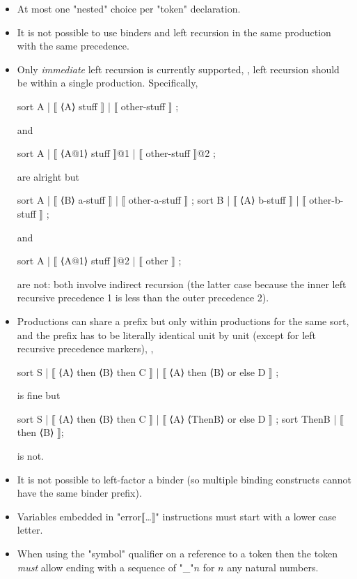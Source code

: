 \documentclass[11pt]{article} %
\begin{document}
\begin{itemize}

\item At most one "nested" choice per "token" declaration.

\item It is not possible to use binders and left recursion in the same production with the same
  precedence.

\item Only \emph{immediate} left recursion is currently supported, \ie, left recursion should be
  within a single production. Specifically,
\begin{hacs}
sort A | ⟦ ⟨A⟩ stuff ⟧ | ⟦ other-stuff ⟧ ;
\end{hacs}
  and 
\begin{hacs}
sort A | ⟦ ⟨A@1⟩ stuff ⟧@1 | ⟦ other-stuff ⟧@2 ;
\end{hacs}
  are alright but
\begin{hacs}
sort A | ⟦ ⟨B⟩ a-stuff ⟧ | ⟦ other-a-stuff ⟧ ;
sort B | ⟦ ⟨A⟩ b-stuff ⟧ | ⟦ other-b-stuff ⟧ ;
\end{hacs}
  and 
\begin{hacs}
sort A  | ⟦ ⟨A@1⟩ stuff ⟧@2 | ⟦ other ⟧ ;
\end{hacs}
  are not: both involve indirect recursion (the latter case because the inner left recursive
  precedence 1 is less than the outer precedence 2). 

\item Productions can share a prefix but only within productions for the same sort, and the prefix
  has to be literally identical unit by unit (except for left recursive precedence markers), \ie,
\begin{code}
sort S | ⟦ ⟨A⟩ then ⟨B⟩ then C ⟧
       | ⟦ ⟨A⟩ then ⟨B⟩ or else D ⟧ ;
\end{code}
  is fine but
\begin{code}
sort S | ⟦ ⟨A⟩ then ⟨B⟩ then C ⟧
       | ⟦ ⟨A⟩ ⟨ThenB⟩ or else D ⟧ ;
sort ThenB | ⟦ then ⟨B⟩ ⟧;
\end{code}
  is not.

\item It is not possible to left-factor a binder (so multiple binding constructs cannot have the
  same binder prefix).

\item Variables embedded in "error⟦…⟧" instructions must start with a lower case letter.

\item When using the "symbol" qualifier on a reference to a token then the token \emph{must} allow
  ending with a sequence of "_"$n$ for $n$ any natural numbers.


\end{itemize}
\end{document}
